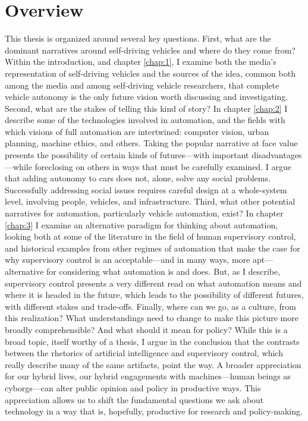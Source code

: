 \section{Overview}

This thesis is organized around several key questions. First, what are
the dominant narratives around self-driving vehicles and where do they
come from? Within the introduction, and chapter \ref{chap:1}, I
examine both the media's representation of self-driving vehicles and
the sources of the idea, common both among the media and among
self-driving vehicle researchers, that complete vehicle autonomy is
the only future vision worth discussing and investigating. Second,
what are the stakes of telling this kind of story? In chapter
\ref{chap:2} I describe some of the technologies involved in
automation, and the fields with which visions of full automation are
intertwined: computer vision, urban planning, machine ethics, and
others. Taking the popular narrative at face value presents the
possibility of certain kinds of futures---with important
disadvantages---while foreclosing on others in ways that must be
carefully examined. I argue that adding autonomy to cars does not,
alone, solve any social problems. Successfully addressing social
issues requires careful design at a whole-system level, involving
people, vehicles, and infrastructure. Third, what other potential
narratives for automation,
particularly vehicle automation, exist? In chapter \ref{chap:3} I
examine an alternative paradigm for thinking about automation, looking
both at some of the literature in the field of human supervisory
control, and historical examples from other regimes of automation that
make the case for why supervisory control is an acceptable---and in
many ways, more apt---alternative for considering what automation is
and does. But, as I describe, supervisory control presents a very
different read on what automation means and where it is headed in the
future, which leads to the possibility of different futures, with
different stakes and trade-offs. Finally, where can we go, as a
culture, from this realization? What understandings need to change to
make this picture more broadly comprehensible? And what should it mean
for policy? While this is a broad topic, itself worthy of a thesis, I
argue in the conclusion that the contrasts
between the rhetorics of artificial intelligence and supervisory
control, which really describe many of the same artifacts, point the
way. A broader appreciation for our hybrid lives, our hybrid
engagements with machines---human beings as cyborgs---can alter public
opinion and policy in
productive ways. This appreciation allows us to shift the fundamental
questions we ask about technology in a way that is, hopefully,
productive for research and policy-making.

